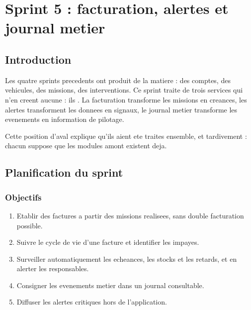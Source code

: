 \chapter{Sprint 5 : facturation, alertes et journal metier}
\label{chap:sprint5}

\section*{Introduction}

Les quatre sprints precedents ont produit de la matiere : des comptes,
des vehicules, des missions, des interventions. Ce sprint traite de trois
services qui n'en creent aucune : ils . La facturation transforme les missions en creances,
les alertes transforment les donnees en signaux, le journal metier
transforme les evenements en information de pilotage.

Cette position d'aval explique qu'ils aient ete traites ensemble, et
tardivement : chacun suppose que les modules amont existent deja.

\section{Planification du sprint}

\subsection{Objectifs}

\begin{enumerate}
  \item Etablir des factures a partir des missions realisees, sans
    double facturation possible.
  \item Suivre le cycle de vie d'une facture et identifier les impayes.
  \item Surveiller automatiquement les echeances, les stocks et les
    retards, et en alerter les responsables.
  \item Consigner les evenements metier dans un journal consultable.
  \item Diffuser les alertes critiques hors de l'application.
\end{enumerate}

